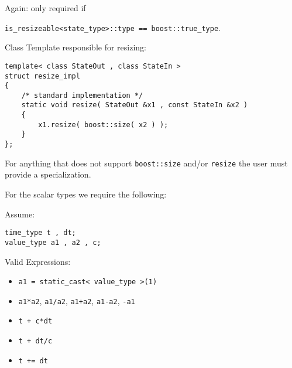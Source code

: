 \begin{frame}[fragile]
Again: only required if \\
\centerline{\lstinline+is_resizeable<state_type>::type == boost::true_type+.}
\vspace{0.5em}

Class Template responsible for resizing:
\begin{lstlisting}
template< class StateOut , class StateIn >
struct resize_impl
{
    /* standard implementation */
    static void resize( StateOut &x1 , const StateIn &x2 )
    {
        x1.resize( boost::size( x2 ) );
    }
};
\end{lstlisting}

For anything that does not support \lstinline+boost::size+ and/or \lstinline+resize+ the user must provide a specialization.

\end{frame}


\begin{frame}[fragile]

For the scalar types we require the following:

Assume:
\begin{lstlisting}
time_type t , dt;
value_type a1 , a2 , c;
\end{lstlisting}

Valid Expressions:
\begin{itemize}
 \item \lstinline+a1 = static_cast< value_type >(1)+
 \item \lstinline+a1*a2+, \lstinline+a1/a2+, \lstinline!a1+a2!, \lstinline+a1-a2+, \lstinline+-a1+ 
 \item \lstinline!t + c*dt!
 \item \lstinline!t + dt/c!
 \item \lstinline!t += dt!
\end{itemize}

\end{frame}



